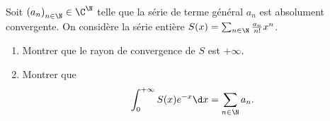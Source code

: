\begin{enonce}
\begin{exercise}[ID={RMS126 E785},subtitle={Centrale PSI 2015},tags={}]
Soit $\left( a_n \right)_{n\in\N}\in{\C}^{\N}$ telle que la série de terme général $a_n$ est absolument convergente.
On considère la série entière $S(x)=\sum_{n\in\N} \frac{a_n}{n!} x^n$.
\begin{enumerate}
  \item Montrer que le rayon de convergence de $S$ est $+\infty$.
  \item Montrer que
    \begin{equation*}
      \int_0^{+\infty} S(x) e^{-x}\d x = \sum_{n\in\N} a_n.
    \end{equation*}
\end{enumerate}
\end{exercise}
\begin{solution}
\end{solution}
\end{enonce}
